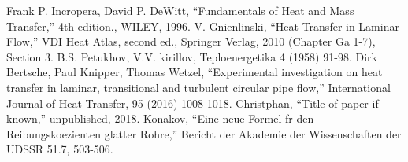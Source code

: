 \documentclass[conference]{IEEEtran}
\begin{document}


\begin{thebibliography}{00}
  Frank P. Incropera, David P. DeWitt, ``Fundamentals of Heat and Mass Transfer,'' 4th edition., WILEY, 1996.
  V. Gnienlinski, ``Heat Transfer in Laminar Flow,'' VDI Heat Atlas, second ed., Springer Verlag, 2010 (Chapter Ga 1-7), Section 3.
  B.S. Petukhov, V.V. kirillov, Teploenergetika 4 (1958) 91-98.
  Dirk Bertsche, Paul Knipper, Thomas Wetzel, ``Experimental investigation on heat transfer in laminar, transitional and turbulent circular pipe flow,'' International Journal of Heat Transfer, 95 (2016) 1008-1018.
 Christphan, ``Title of paper if known,'' unpublished, 2018.
 Konakov, ``Eine neue Formel fr den Reibungskoezienten glatter Rohre,'' Bericht der Akademie der Wissenschaften der UDSSR 51.7, 503-506.

%
%

\end{thebibliography}
\end{document}
